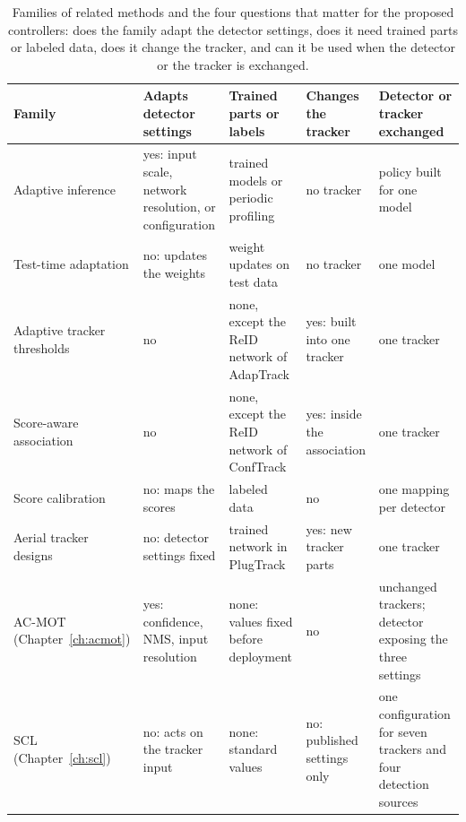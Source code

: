 \begin{table}[tbp]
\centering
\caption{Families of related methods and the four questions that matter for the proposed controllers: does the family adapt the detector settings, does it need trained parts or labeled data, does it change the tracker, and can it be used when the detector or the tracker is exchanged.}
\label{tab:rw-properties}
\footnotesize\setlength{\tabcolsep}{4pt}\renewcommand{\arraystretch}{1.25}
\begin{tabular}{>{\raggedright\arraybackslash}p{3.3cm}>{\raggedright\arraybackslash}p{2.5cm}>{\raggedright\arraybackslash}p{2.7cm}>{\raggedright\arraybackslash}p{2.4cm}>{\raggedright\arraybackslash}p{3.0cm}}
\toprule
Family & Adapts detector settings & Trained parts or labels & Changes the tracker & Detector or tracker exchanged\\
\midrule
Adaptive inference \cite{chin2019adascale,xu2020approxdet,jiang2018chameleon,yang2020ranet} & yes: input scale, network resolution, or configuration & trained models or periodic profiling & no tracker & policy built for one model\\
Test-time adaptation \cite{wang2021tent} & no: updates the weights & weight updates on test data & no tracker & one model\\
Adaptive tracker thresholds \cite{ma2023adaptivebytetrack,shim2024adaptrack,act2026adaptive} & no & none, except the ReID network of AdapTrack & yes: built into one tracker & one tracker\\
Score-aware association \cite{jung2024conftrack,solano2025utrack,stanojevic2024boosttrack,qi2026oatrack} & no & none, except the ReID network of ConfTrack & yes: inside the association & one tracker\\
Score calibration \cite{guo2017calibration,kuppers2020detcalib} & no: maps the scores & labeled data & no & one mapping per detector\\
Aerial tracker designs \cite{liu2022uavmot,kim2024afjpda,kim2026plugtrack} & no: detector settings fixed & trained network in PlugTrack & yes: new tracker parts & one tracker\\
\midrule
AC-MOT (Chapter~\ref{ch:acmot}) & yes: confidence, NMS, input resolution & none: values fixed before deployment & no & unchanged trackers; detector exposing the three settings\\
SCL (Chapter~\ref{ch:scl}) & no: acts on the tracker input & none: standard values & no: published settings only & one configuration for seven trackers and four detection sources\\
\bottomrule
\end{tabular}
\end{table}

